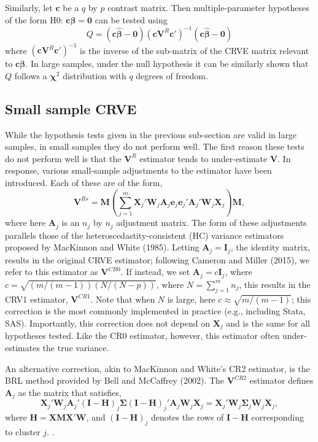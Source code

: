\documentclass[12pt]{article}
\newcommand{\bm}{\mathbf}
\newcommand{\bs}{\boldsymbol}
\begin{document}
Similarly, let $\bm{c}$ be a $q$ by $p$ contrast matrix. Then multiple-parameter hypotheses of the form H0: $\bm{c}\bs{\beta} = \bm{0}$ can be tested using
\begin{equation}
\label{eq:Qtest}
Q = (\bm{c}\hat{\bs\beta} - \bm{0})(\bm{c}\bm{V}^{R}\bm{c'})^{-1}(\bm{c}\hat{\bs\beta} - \bm{0})
\end{equation}
where $({\bm{c}\bm{V}^{R}\bm{c'}})^{-1}$ is the inverse of the sub-matrix of the CRVE matrix relevant to $\bm{c}\bs\beta$. In large samples, under the null hypothesis it can be similarly shown that $Q$ follows a $\bs{\chi}^{2}$ distribution with $q$ degrees of freedom.



\subsection{Small sample CRVE}
While the hypothesis tests given in the previous sub-section are valid in large samples, in small samples they do not perform well. The first reason these tests do not perform well is that the $\bm{V}^R$ estimator tends to under-estimate $\bm{V}$. In response, various small-sample adjustments to the estimator have been introduced. Each of these are of the form,
\begin{equation}
\label{eq:V_small}
\bm{V}^{Rs} = \bm{M}\left(\sum_{j=1}^m \bm{X}_j'\bm{W}_j \bm{A}_j \bm{e}_j \bm{e}_j' \bm{A}_j' \bm{W}_j \bm{X}_j\right) \bm{M},
\end{equation}
where here $\bm{A}_j$ is an $n_j$ by $n_j$ adjustment matrix. The form of these adjustments parallels those of the heteroscedastity-consistent (HC) variance estimators proposed by MacKinnon and White (1985). Letting $\bm{A}_j = \bm{I}_j$, the identity matrix, results in the original CRVE estimator; following Cameron and Miller (2015), we refer to this estimator as $\bm{V}^{CR0}$. If instead, we set $\bm{A}_j = c\bm{I}_j$, where $c = \sqrt{(m/(m-1))(N/(N - p))}$, where $N = \sum_{j=1}^m n_j$, this results in the CRV1 estimator, $\bm{V}^{CR1}$. Note that when $N$ is large, here $c \approx \sqrt{m/(m-1)}$; this correction is the most commonly implemented in practice (e.g., including Stata, SAS). Importantly, this correction does not depend on $\bm{X}_j$ and is the same for all hypotheses tested. Like the CR0 estimator, however, this estimator often under-estimates the true variance.


An alternative correction, akin to MacKinnon and White's CR2 estimator, is the BRL method provided by Bell and McCaffrey (2002). The $\bm{V}^{CR2}$ estimator defines $\bm{A}_j$ as the matrix that satisfies,
\begin{equation}
\label{eq:CR2_criterion}
\bm{X}_j' \bm{W}_j \bm{A}_j' \left(\bm{I} - \bm{H}\right)_j \bs{\Sigma} \left(\bm{I} - \bm{H}\right)_j' \bm{A}_j \bm{W}_j \bm{X}_j = \bm{X}_j' \bm{W}_j \bs{\Sigma}_j \bm{W}_j \bm{X}_j,
\end{equation}
where $\bm{H} = \bm{X}\bm{M}\bm{X}'\bm{W}$, and $\left(\bm{I} - \bm{H}\right)_j$ denotes the rows of $\bm{I} - \bm{H}$ corresponding to cluster $j$. . 
\end{document}
